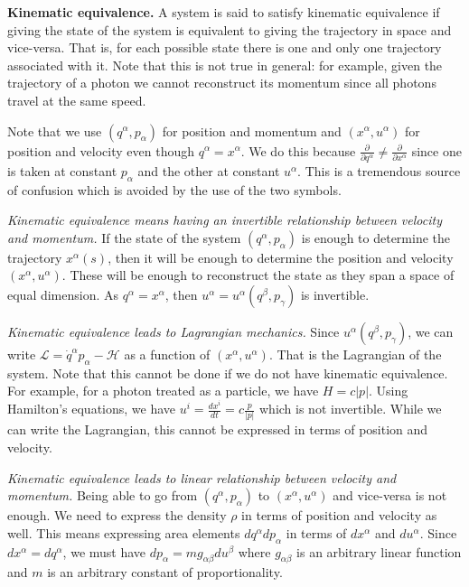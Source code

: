 \documentclass[twocolumn]{article}
\begin{document}
\textbf{Kinematic equivalence.} A system is said to satisfy kinematic equivalence if giving the state of the system is equivalent to giving the trajectory in space and vice-versa. That is, for each possible state there is one and only one trajectory associated with it. Note that this is not true in general: for example, given the trajectory of a photon we cannot reconstruct its momentum since all photons travel at the same speed.

Note that we use $(q^\alpha, p_\alpha)$ for position and momentum and $(x^\alpha, u^\alpha)$ for position and velocity even though $q^\alpha = x^\alpha$. We do this because $\frac{\partial}{\partial q^\alpha} \neq \frac{\partial}{\partial x^\alpha}$ since one is taken at constant $p_\alpha$ and the other at constant $u^\alpha$. This is a tremendous source of confusion which is avoided by the use of the two symbols.

\emph{Kinematic equivalence means having an invertible relationship between velocity and momentum.} If the state of the system $(q^\alpha, p_\alpha)$ is enough to determine the trajectory $x^\alpha(s)$, then it will be enough to determine the position and velocity $(x^\alpha, u^\alpha)$. These will be enough to reconstruct the state as they span a space of equal dimension. As $q^\alpha = x^\alpha$, then $u^\alpha = u^\alpha(q^\beta, p_\gamma)$ is invertible.

\emph{Kinematic equivalence leads to Lagrangian mechanics.} Since $u^\alpha(q^\beta, p_\gamma)$, we can write $\mathcal{L} = \dot{q}^\alpha p_\alpha - \mathcal{H}$ as a function of $(x^\alpha, u^\alpha)$. That is the Lagrangian of the system. Note that this cannot be done if we do not have kinematic equivalence. For example, for a photon treated as a particle, we have $H = c |p|$. Using Hamilton's equations, we have $u^i = \frac{dx^i}{dt} = c \frac{p}{|p|}$ which is not invertible. While we can write the Lagrangian, this cannot be expressed in terms of position and velocity.

\emph{Kinematic equivalence leads to linear relationship between velocity and momentum.} Being able to go from $(q^\alpha, p_\alpha)$ to $(x^\alpha, u^\alpha)$ and vice-versa is not enough. We need to express the density $\rho$ in terms of position and velocity as well. This means expressing area elements $dq^\alpha dp_\alpha$ in terms of $dx^\alpha$ and $du^\alpha$. Since $dx^\alpha = dq^\alpha$, we must have $dp_\alpha = m g_{\alpha \beta} du^\beta$ where $g_{\alpha \beta}$ is an arbitrary linear function and $m$ is an arbitrary constant of proportionality. 
\end{document}
